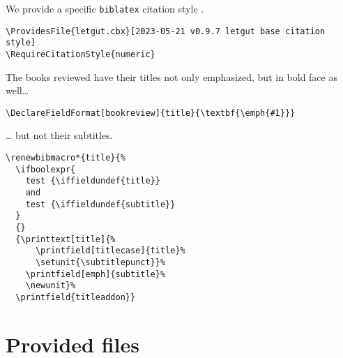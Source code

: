 \documentclass{letgut}
\begin{document}
We provide a specific \lstinline+biblatex+ citation style .

\begin{lstlisting}
\ProvidesFile{letgut.cbx}[2023-05-21 v0.9.7 letgut base citation style]
\RequireCitationStyle{numeric}
\end{lstlisting}

The books reviewed have their titles not only emphasized, but in bold face as
well\ldots{}

\begin{lstlisting}
\DeclareFieldFormat[bookreview]{title}{\textbf{\emph{#1}}}
\end{lstlisting}

\ldots{} but not their subtitles.

\begin{lstlisting}
\renewbibmacro*{title}{%
  \ifboolexpr{
    test {\iffieldundef{title}}
    and
    test {\iffieldundef{subtitle}}
  }
  {}
  {\printtext[title]{%
      \printfield[titlecase]{title}%
      \setunit{\subtitlepunct}}%
    \printfield[emph]{subtitle}%
    \newunit}%
  \printfield{titleaddon}}
\end{lstlisting}

\section{Provided files}
\label{Providedfiles-g09h55h0jlj0}
\end{document}
